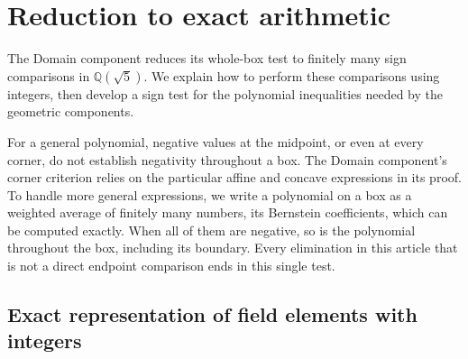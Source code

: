 \pagebreak[0]
\section{Reduction to exact arithmetic}\label{sec:reduction-to-exact-arithmetic}

The Domain component reduces its whole-box test to finitely many sign
comparisons in $\mathbb Q(\sqrt5)$. We explain how to perform these
comparisons using integers, then develop a sign test for the polynomial
inequalities needed by the geometric components.

For a general polynomial, negative values at the midpoint, or even at
every corner, do not establish negativity throughout a box. The Domain
component's corner criterion relies on the particular affine and concave
expressions in its proof. To handle more general expressions, we write a
polynomial on a box as a weighted average of finitely many numbers, its
Bernstein coefficients, which can be computed exactly. When all of them
are negative, so is the polynomial throughout the box, including its
boundary. Every elimination in this article that is not a direct endpoint
comparison ends in this single test.

\subsection{Exact representation of field elements with integers}\label{subsec:exact-representation-of-field-elements-with-integers}

